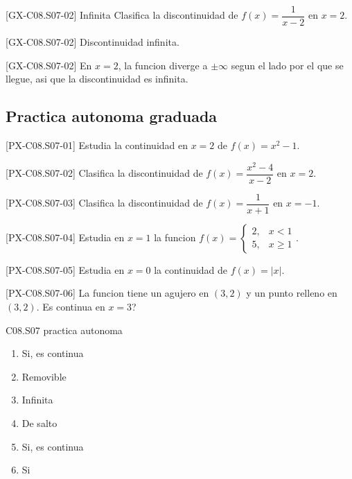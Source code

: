 \begin{guidedexercise}{[GX-C08.S07-02] Infinita}
Clasifica la discontinuidad de \(f(x)=\dfrac{1}{x-2}\) en \(x=2\).
\end{guidedexercise}

\begin{shortanswer}{[GX-C08.S07-02]}
Discontinuidad infinita.
\end{shortanswer}

\begin{fullsolution}{[GX-C08.S07-02]}
En \(x=2\), la funcion diverge a \(\pm\infty\) segun el lado por el que se llegue, asi que la
discontinuidad es infinita.
\end{fullsolution}

\subsection*{Practica autonoma graduada}
\begin{exercise}{[PX-C08.S07-01] Estudia la continuidad en \(x=2\) de \(f(x)=x^2-1\).}
\end{exercise}
\begin{exercise}{[PX-C08.S07-02] Clasifica la discontinuidad de \(f(x)=\dfrac{x^2-4}{x-2}\) en \(x=2\).}
\end{exercise}
\begin{exercise}{[PX-C08.S07-03] Clasifica la discontinuidad de \(f(x)=\dfrac{1}{x+1}\) en \(x=-1\).}
\end{exercise}
\begin{exercise}{[PX-C08.S07-04] Estudia en \(x=1\) la funcion \(f(x)=\begin{cases}2,&x<1\\5,&x\geq1\end{cases}\).}
\end{exercise}
\begin{exercise}{[PX-C08.S07-05] Estudia en \(x=0\) la continuidad de \(f(x)=|x|\).}
\end{exercise}
\begin{exercise}{[PX-C08.S07-06] La funcion tiene un agujero en \((3,2)\) y un punto relleno en \((3,2)\). Es continua en \(x=3\)?}
\end{exercise}

\begin{shortanswer}{C08.S07 practica autonoma}
\begin{enumerate}[label=\textbf{PX-C08.S07-\arabic*:}, leftmargin=*]
  \item Si, es continua
  \item Removible
  \item Infinita
  \item De salto
  \item Si, es continua
  \item Si
\end{enumerate}
\end{shortanswer}

